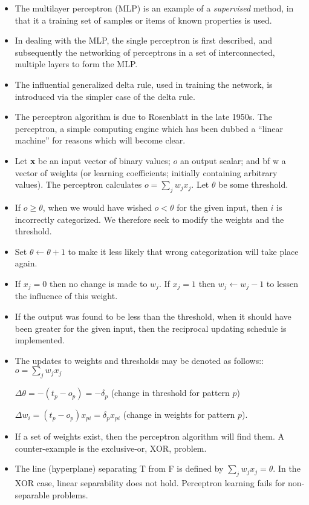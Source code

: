 \documentclass[a4,dvips]{seminar}
\newcommand{\heading}[1]{%
  \begin{center}
    \large\bf
    \shadowbox{#1}%
  \end{center}
  \vspace{1ex minus 1ex}}
\begin{document}
\begin{slide}
\textcolor {reddish} {\heading{Multilayer Perceptron}}
\begin{itemize}
\item 
The multilayer perceptron (MLP) is an example of a {\sl supervised} method, 
in that it a training set of samples or items of known properties is
used.  
\item In dealing with the MLP, the single perceptron is first described, and 
subsequently the networking of perceptrons in a set of interconnected, 
multiple layers to form the MLP.  
\item The influential generalized delta rule, used
in training the network, is introduced via the simpler case of the delta
rule. 
\item The perceptron algorithm is due to Rosenblatt in the late 1950s.  
The perceptron, a simple computing engine which has been dubbed a 
``linear machine'' for reasons which will become clear.
\item Let {\bf x}  be an input vector of binary values; $o$ an output scalar; 
and
{bf w} a vector of weights (or learning coefficients; initially containing
arbitrary values).  The perceptron calculates $ o = \sum_j w_j x_j$.  Let
$ \theta  $ be some threshold.  
\item If $o \geq \theta $, when we would have wished $o < \theta$ for the given
input, then $i$ is incorrectly categorized.  We therefore seek to modify
the weights and the threshold.  
\item 
Set $\theta \longleftarrow \theta + 1 $ to make it less likely that wrong
categorization will take place again. 
\item If $x_j = 0$ then no change is made to $w_j$.  If $x_j = 1$ then 
$w_j \longleftarrow w_j - 1$ to lessen the influence of this weight.  
\item If the output was found to be less than the threshold, when it should 
have been greater for the given input, then the reciprocal updating 
schedule is implemented.  
\item The updates to weights and thresholds may be 
denoted as follows::
$ o = \sum_j w_j x_j $

$ \Delta \theta = - (t_p - o_p) = -\delta_p $
(change in threshold for pattern $p$)

$ \Delta w_i = (t_p - o_p) x_{pi} = \delta_p x_{pi} $
(change in weights for pattern $p$).
\item If a set of weights exist, then the perceptron algorithm will find them.
A counter-example is the exclusive-or, XOR, problem.
\item The line (hyperplane) separating T from F is defined by $\sum_j w_j x_j
= \theta $. In the XOR case, linear separability does not hold.  Perceptron
learning fails for non-separable problems.
\end{itemize}
\end{slide}
\end{document}

